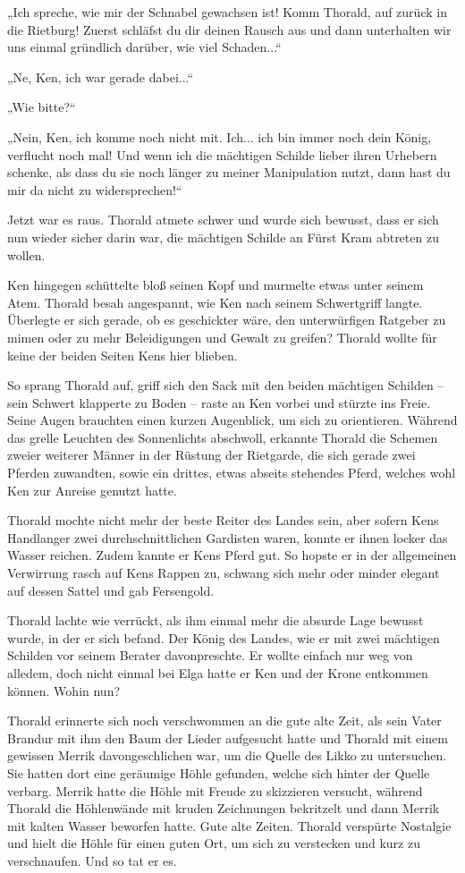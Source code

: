 „Ich spreche, wie mir der Schnabel gewachsen ist! Komm Thorald, auf zurück in die Rietburg! Zuerst schläfst du dir deinen Rausch aus und dann unterhalten wir uns einmal gründlich darüber, wie viel Schaden...“

„Ne, Ken, ich war gerade dabei...“

„Wie bitte?“

„Nein, Ken, ich komme noch nicht mit. Ich... ich bin immer noch dein König, verflucht noch mal! Und wenn ich die mächtigen Schilde lieber ihren Urhebern schenke, als dass du sie noch länger zu meiner Manipulation nutzt, dann hast du mir da nicht zu widersprechen!“

Jetzt war es raus. Thorald atmete schwer und wurde sich bewusst, dass er sich nun wieder sicher darin war, die mächtigen Schilde an Fürst Kram abtreten zu wollen.

Ken hingegen schüttelte bloß seinen Kopf und murmelte etwas unter seinem Atem. Thorald besah angespannt, wie Ken nach seinem Schwertgriff langte. Überlegte er sich gerade, ob es geschickter wäre, den unterwürfigen Ratgeber zu mimen oder zu mehr Beleidigungen und Gewalt zu greifen? Thorald wollte für keine der beiden Seiten Kens hier blieben.

So sprang Thorald auf, griff sich den Sack mit den beiden mächtigen Schilden – sein Schwert klapperte zu Boden – raste an Ken vorbei und stürzte ins Freie. Seine Augen brauchten einen kurzen Augenblick, um sich zu orientieren. Während das grelle Leuchten des Sonnenlichts abschwoll, erkannte Thorald die Schemen zweier weiterer Männer in der Rüstung der Rietgarde, die sich gerade zwei Pferden zuwandten, sowie ein drittes, etwas abseits stehendes Pferd, welches wohl Ken zur Anreise genutzt hatte.

Thorald mochte nicht mehr der beste Reiter des Landes sein, aber sofern Kens Handlanger zwei durchschnittlichen Gardisten waren, konnte er ihnen locker das Wasser reichen. Zudem kannte er Kens Pferd gut. So hopste er in der allgemeinen Verwirrung rasch auf Kens Rappen zu, schwang sich mehr oder minder elegant auf dessen Sattel und gab Fersengold.

Thorald lachte wie verrückt, als ihm einmal mehr die absurde Lage bewusst wurde, in der er sich befand. Der König des Landes, wie er mit zwei mächtigen Schilden vor seinem Berater davonpreschte. Er wollte einfach nur weg von alledem, doch nicht einmal bei Elga hatte er Ken und der Krone entkommen können. Wohin nun?

Thorald erinnerte sich noch verschwommen an die gute alte Zeit, als sein Vater Brandur mit ihm den Baum der Lieder aufgesucht hatte und Thorald mit einem gewissen Merrik davongeschlichen war, um die Quelle des Likko zu untersuchen. Sie hatten dort eine geräumige Höhle gefunden, welche sich hinter der Quelle verbarg. Merrik hatte die Höhle mit Freude zu skizzieren versucht, während Thorald die Höhlenwände mit kruden Zeichnungen bekritzelt und dann Merrik mit kalten Wasser beworfen hatte. Gute alte Zeiten. Thorald verspürte Nostalgie und hielt die Höhle für einen guten Ort, um sich zu verstecken und kurz zu verschnaufen. Und so tat er es.



